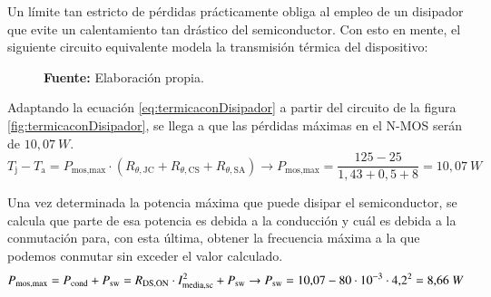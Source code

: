 \documentclass[12pt]{report} %
\begin{document}
Un límite tan estricto de pérdidas prácticamente obliga al empleo de un disipador que evite un calentamiento tan drástico del semiconductor. Con esto en mente, el siguiente circuito equivalente modela la transmisión térmica del dispositivo: 
\begin{figure}[H]
    \centering
    \fontsize{10}{12}\selectfont 
    
    
    \vspace{2mm}
    {\raggedleft \textbf{Fuente:} Elaboración propia. \par}
\end{figure}
Adaptando la ecuación \ref{eq:termicaconDisipador} a partir del circuito de la figura \ref{fig:termicaconDisipador}, se llega a que las pérdidas máximas en el N-MOS serán de $10{,}07~W$.
\begin{equation}
    \label{eq:termicaconDisipador}
    T_\text{j} - T_\text{a} = P_\text{mos,max} \cdot (R_{\theta,\text{JC}}+R_{\theta,\text{CS}}+R_{\theta,\text{SA}}) \rightarrow P_\text{mos,max} = \frac{125-25}{1{,}43+0{,}5+8}=10{,}07~W
\end{equation}

Una vez determinada la potencia máxima que puede disipar el semiconductor, se calcula que parte de esa potencia es debida a la conducción y cuál es debida a la conmutación para, con esta última, obtener la frecuencia máxima a la que podemos conmutar sin exceder el valor calculado. 
\begin{equation}
    \label{eq:perdidasNMOS}
    P_\text{mos,max} = P_{\text{cond}} + P_{\text{sw}} = R_{\text{DS,ON}} \cdot I_{\text{media,sc}}^2 + P_{\text{sw}}\rightarrow P_{\text{sw}} = 10{,}07 - 80\cdot 10^{-3} \cdot 4{,}2^2 = 8{,}66~W
\end{equation}
\end{document}
